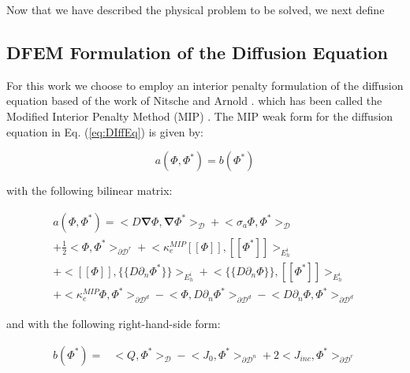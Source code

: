 \documentclass{anstrans}
\renewcommand{\vec}[1]{\bm{#1}} %
\begin{document}
Now that we have described the physical problem to be solved, we next define 

\subsection{DFEM Formulation of the Diffusion Equation}
\label{sec::DFEM}

For this work we choose to employ an interior penalty formulation of the diffusion equation based of the work of Nitsche and Arnold \cite{ref::nitsche_IP,ref::arnold_1982_IP}. which has been called the Modified Interior Penalty Method (MIP) \cite{wang2009adaptive,ref::DSA_2D_arb_poly,ref::DSA_wang_ragusa}. The MIP weak form for the diffusion equation in Eq. (\ref{eq:DIffEq}) is given by:

\begin{equation}
a( \Phi, \Phi^*) = b(\Phi^*)
\label{eq:MIP_bilinear_form}
\end{equation}

\noindent with the following bilinear matrix:

\begin{equation}
\begin{aligned}
a( \Phi, \Phi^*) = \Big<  D \vec{\nabla}  \Phi , \vec{\nabla} \Phi^*  \Big>_{\mathcal{D}} + \Big<  \sigma_a   \Phi ,  \Phi^*  \Big>_{\mathcal{D}} \\
+  \frac{1}{2} \Big<    \Phi ,   \Phi^*\Big>_{\partial \mathcal{D}^r} +  \Big< \kappa_e^{MIP} [\![   \Phi ]\!] , [\![  \Phi^* ]\!]\Big>_{E_h^i}  \\ 
+ \Big<  [\![   \Phi ]\!] , \{\!\{  D \partial_n \Phi^* \}\!\}\Big>_{E_h^i} +\Big< \{\!\{  D \partial_n  \Phi \}\!\} , [\![  \Phi^* ]\!]\Big>_{E_h^i} \\
+ \Big< \kappa_e^{MIP}   \Phi ,   \Phi^* \Big>_{\partial \mathcal{D}^d} -\Big<   \Phi  ,  D \partial_n \Phi^* \Big>_{\partial \mathcal{D}^d} -\Big<   D \partial_n  \Phi ,   \Phi^*\Big>_{\partial \mathcal{D}^d}  
\end{aligned}
\label{eq::MIP_bilinear_op}
\end{equation}

\noindent and with the following right-hand-side form:

\begin{equation}
\begin{aligned}
b(\Phi^*) =& \Big<  Q, \Phi^*  \Big>_{\mathcal{D}}  - \Big<   J_{0}, \Phi^*  \Big>_{\partial \mathcal{D}^n} +  2 \Big<   J_{inc}, \Phi^*  \Big>_{\partial \mathcal{D}^r} 
\end{aligned}
\label{eq::MIP_rhs_op}
\end{equation}
\end{document}
